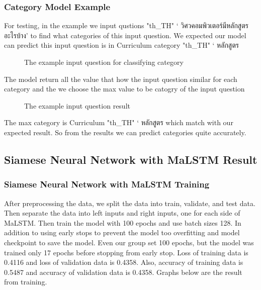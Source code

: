 \documentclass[12pt,oneside,openright,a4paper]{cpe-english-project}
\begin{document}
\subsubsection{Category Model Example}
For testing, in the example we input qustions {
\XeTeXlinebreaklocale "th_TH"	
\thaifont 
 ‘ วิศวคอมพิวเตอร์มีหลักสูตรอะไรบ้าง’ }to find what categories of this input question. We expected our model can predict this input question is in Curriculum category  {
\XeTeXlinebreaklocale "th_TH"	
\thaifont 
 ‘ หลักสูตร } 
\begin{figure}[!h]\centering
{}
\caption{The example input question for classifying category}\label{fig:The example input question for classifying category}
\end{figure}
The model return all the value that how the input question similar for each category and the we choose the max value to be catogry of the input question
\begin{figure}[!h]\centering
{}
\caption{The example input question result}\label{fig:The example input question result}
\end{figure}
\pagebreak
The max category is Curriculum {
\XeTeXlinebreaklocale "th_TH"	
\thaifont 
 ‘ หลักสูตร } which match with our expected result. So from the results we can predict categories quite accurately. 
\subsection{Siamese Neural Network with MaLSTM Result}
\subsubsection{Siamese Neural Network with MaLSTM Training}
\label{siamese_result}
After preprocessing the data, we split the data into train, validate, and test data. Then separate the data into left inputs and right inputs, one for each side of MaLSTM. Then train the model with 100 epochs and use batch sizes 128. In addition to using early stops to prevent the model too overfitting and model checkpoint to save the model. Even our group set 100 epochs, but the model was trained only 17 epochs before stopping from early stop. Loss of training data is 0.4116 and loss of validation data is 0.4358. Also, accuracy of training data is 0.5487 and accuracy of validation data is 0.4358. Graphs below are the result from training.
\end{document}
